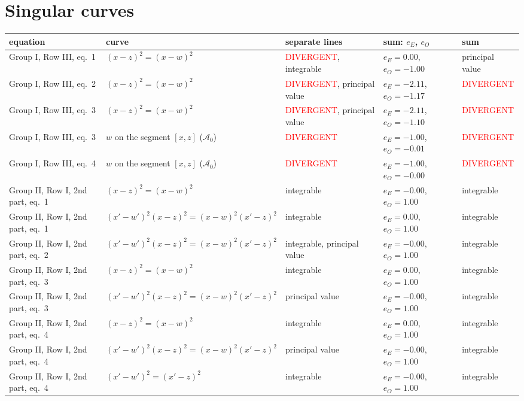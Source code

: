 \documentclass[10pt]{article}
\begin{document}
\section{Singular curves}
{\small
\begin{longtable}{p{4.3cm}p{3.6cm}p{3.4cm}p{3cm}p{2.2cm}}
\toprule
equation & curve & separate lines & sum: $e_E$, $e_O$ & sum\\
\midrule
Group I, Row III, eq.~1 & $(x-z)^2=(x-w)^2$ & \textcolor{red}{DIVERGENT}, integrable & $e_E=0.00$, $e_O=-1.00$ & principal value\\
Group I, Row III, eq.~2 & $(x-z)^2=(x-w)^2$ & \textcolor{red}{DIVERGENT}, principal value & $e_E=-2.11$, $e_O=-1.17$ & \textcolor{red}{DIVERGENT}\\
Group I, Row III, eq.~3 & $(x-z)^2=(x-w)^2$ & \textcolor{red}{DIVERGENT}, principal value & $e_E=-2.11$, $e_O=-1.10$ & \textcolor{red}{DIVERGENT}\\
Group I, Row III, eq.~3 & $w$ on the segment $[x,z]$ ($\mathcal A_0$) & \textcolor{red}{DIVERGENT} & $e_E=-1.00$, $e_O=-0.01$ & \textcolor{red}{DIVERGENT}\\
Group I, Row III, eq.~4 & $w$ on the segment $[x,z]$ ($\mathcal A_0$) & \textcolor{red}{DIVERGENT} & $e_E=-1.00$, $e_O=-0.00$ & \textcolor{red}{DIVERGENT}\\
Group II, Row I, 2nd part, eq.~1 & $(x-z)^2=(x-w)^2$ & integrable & $e_E=-0.00$, $e_O=1.00$ & integrable\\
Group II, Row I, 2nd part, eq.~1 & $(x'-w')^2(x-z)^2=(x-w)^2(x'-z)^2$ & integrable & $e_E=0.00$, $e_O=1.00$ & integrable\\
Group II, Row I, 2nd part, eq.~2 & $(x'-w')^2(x-z)^2=(x-w)^2(x'-z)^2$ & integrable, principal value & $e_E=-0.00$, $e_O=1.00$ & integrable\\
Group II, Row I, 2nd part, eq.~3 & $(x-z)^2=(x-w)^2$ & integrable & $e_E=0.00$, $e_O=1.00$ & integrable\\
Group II, Row I, 2nd part, eq.~3 & $(x'-w')^2(x-z)^2=(x-w)^2(x'-z)^2$ & principal value & $e_E=-0.00$, $e_O=1.00$ & integrable\\
Group II, Row I, 2nd part, eq.~4 & $(x-z)^2=(x-w)^2$ & integrable & $e_E=0.00$, $e_O=1.00$ & integrable\\
Group II, Row I, 2nd part, eq.~4 & $(x'-w')^2(x-z)^2=(x-w)^2(x'-z)^2$ & principal value & $e_E=-0.00$, $e_O=1.00$ & integrable\\
Group II, Row I, 2nd part, eq.~4 & $(x'-w')^2=(x'-z)^2$ & integrable & $e_E=-0.00$, $e_O=1.00$ & integrable\\

\end{longtable}}
\end{document}
